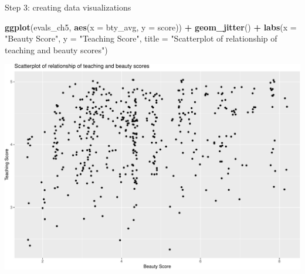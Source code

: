 \documentclass[
  ignorenonframetext,
]{beamer}
\newenvironment{Shaded}{\begin{snugshade}}{\end{snugshade}}
\newcommand{\AttributeTok}[1]{\textcolor[rgb]{0.13,0.29,0.53}{#1}}
\newcommand{\FunctionTok}[1]{\textcolor[rgb]{0.13,0.29,0.53}{\textbf{#1}}}
\newcommand{\NormalTok}[1]{#1}
\newcommand{\SpecialCharTok}[1]{\textcolor[rgb]{0.81,0.36,0.00}{\textbf{#1}}}
\newcommand{\StringTok}[1]{\textcolor[rgb]{0.31,0.60,0.02}{#1}}
\begin{document}
\begin{frame}[fragile]{Step 3: creating data visualizations}
\protect\hypertarget{step-3-creating-data-visualizations}{}
\tiny

\begin{Shaded}
\begin{Highlighting}[]
\FunctionTok{ggplot}\NormalTok{(evals\_ch5, }\FunctionTok{aes}\NormalTok{(}\AttributeTok{x =}\NormalTok{ bty\_avg, }\AttributeTok{y =}\NormalTok{ score)) }\SpecialCharTok{+}
  \FunctionTok{geom\_jitter}\NormalTok{() }\SpecialCharTok{+}
  \FunctionTok{labs}\NormalTok{(}\AttributeTok{x =} \StringTok{"Beauty Score"}\NormalTok{, }\AttributeTok{y =} \StringTok{"Teaching Score"}\NormalTok{,}
       \AttributeTok{title =} \StringTok{"Scatterplot of relationship of teaching and beauty scores"}\NormalTok{)}
\end{Highlighting}
\end{Shaded}

\begin{center}\includegraphics[width=0.5\linewidth,height=0.5\textheight]{Week4_files/figure-beamer/unnamed-chunk-17-1} \end{center}
\normalsize
\end{frame}
\end{document}
